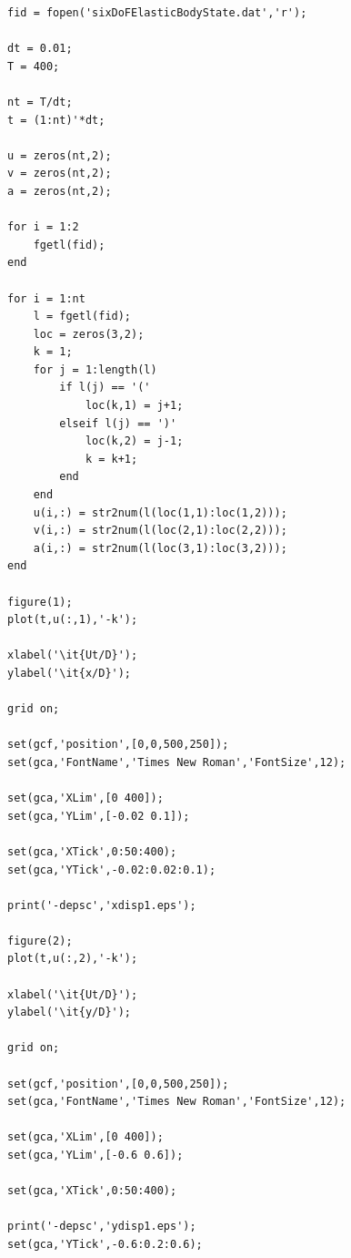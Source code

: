 \begin{lstlisting}
fid = fopen('sixDoFElasticBodyState.dat','r');

dt = 0.01;
T = 400;

nt = T/dt;
t = (1:nt)'*dt;

u = zeros(nt,2);
v = zeros(nt,2);
a = zeros(nt,2);

for i = 1:2
    fgetl(fid);
end

for i = 1:nt
    l = fgetl(fid);
    loc = zeros(3,2);
    k = 1;
    for j = 1:length(l)   
        if l(j) == '('
            loc(k,1) = j+1;
        elseif l(j) == ')'
            loc(k,2) = j-1;
            k = k+1;
        end
    end   
    u(i,:) = str2num(l(loc(1,1):loc(1,2)));
    v(i,:) = str2num(l(loc(2,1):loc(2,2)));
    a(i,:) = str2num(l(loc(3,1):loc(3,2)));
end

figure(1);
plot(t,u(:,1),'-k');

xlabel('\it{Ut/D}');
ylabel('\it{x/D}');

grid on;

set(gcf,'position',[0,0,500,250]);
set(gca,'FontName','Times New Roman','FontSize',12);

set(gca,'XLim',[0 400]);
set(gca,'YLim',[-0.02 0.1]);

set(gca,'XTick',0:50:400);
set(gca,'YTick',-0.02:0.02:0.1);

print('-depsc','xdisp1.eps');

figure(2);
plot(t,u(:,2),'-k');

xlabel('\it{Ut/D}');
ylabel('\it{y/D}');

grid on;

set(gcf,'position',[0,0,500,250]);
set(gca,'FontName','Times New Roman','FontSize',12);

set(gca,'XLim',[0 400]);
set(gca,'YLim',[-0.6 0.6]);

set(gca,'XTick',0:50:400);

print('-depsc','ydisp1.eps');
set(gca,'YTick',-0.6:0.2:0.6);
\end{lstlisting}

